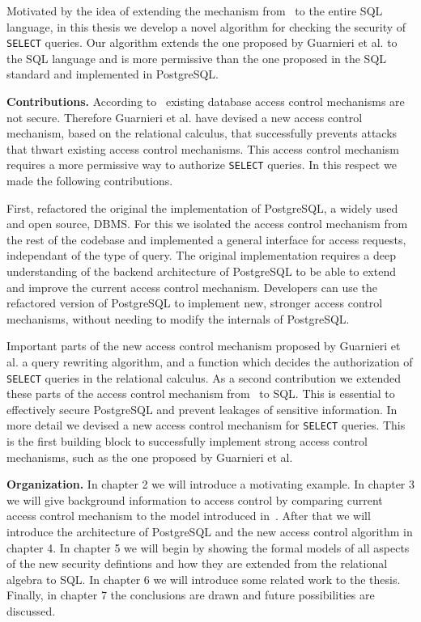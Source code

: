 Motivated by the idea of extending the mechanism from~\cite{guarnieri2016strong} to the entire SQL language, in this thesis we develop a novel algorithm for checking the security of \texttt{SELECT} queries.
%
Our algorithm extends the one proposed by Guarnieri et al. to the SQL language and is more permissive than the one proposed in the SQL standard and  implemented in PostgreSQL.

\smallskip
\noindent
{\bf Contributions.}
According to~\cite{guarnieri2016strong} existing database access control mechanisms are not secure. 
%
Therefore Guarnieri et al. have devised a new access control mechanism, based on the relational calculus, that successfully prevents attacks that thwart existing access control mechanisms.
%
This access control mechanism requires a more permissive way to authorize \texttt{SELECT} queries.
%
In this respect we made the following contributions.

First, refactored the original the implementation of PostgreSQL, a widely used and open source, DBMS.
%
For this we isolated the access control mechanism from the rest of the codebase and implemented a general interface for access requests, independant of the type of query.
%
The original implementation requires a deep understanding of the backend architecture of PostgreSQL to be able to extend and improve the current access control mechanism.
%
Developers can use the refactored version of PostgreSQL to implement new, stronger access control mechanisms, without needing to modify the internals of PostgreSQL.

Important parts of the new access control mechanism proposed by Guarnieri et al. a query rewriting algorithm, and a function which decides the authorization of \texttt{SELECT} queries in the relational calculus.
%
As a second contribution we extended these parts of the access control mechanism from~\cite{guarnieri2016strong} to SQL.
%
This is essential to effectively secure PostgreSQL and prevent leakages of sensitive information. 
%
In more detail we devised a new access control mechanism for \texttt{SELECT} queries.
%
This is the first building block to successfully implement strong access control mechanisms, such as the one proposed by Guarnieri et al.

\smallskip
\noindent
{\bf Organization.}
%
In chapter 2 we will introduce a motivating example.
%
In chapter 3 we will give background information to access control by comparing current access control mechanism to the model introduced in~\cite{guarnieri2016strong}.
%
After that we will introduce the architecture of PostgreSQL and the new access control algorithm in chapter 4. 
%
In chapter 5 we will begin by showing the formal models of all aspects of the new security defintions and how they are extended from the relational algebra to SQL.  
%
In chapter 6 we will introduce some related work to the thesis. 
%
Finally, in chapter 7 the conclusions are drawn and future possibilities are discussed.